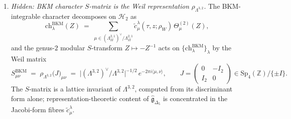\begin{proposition}
\begin{enumerate}[label=\textup{(\roman*)}]
\[
 \tilde c^\lambda_\mu(\tau,z;\rho_W)\;=\;\mathrm{ch}_{L(\lambda)}(\tau,z;\rho_W)/\Delta_5(\tau,z,\rho_W)
\]
are holomorphic Jacobi forms of \emph{genus~$2$}, weight~$-1$, index~$1$ in the sense of Krieg 1995 \emph{Proc.\ AMS}~123 Theorem~3.1, with nonnegative integral Fourier coefficients encoding $\mathfrak g_{\Delta_5}$-root multiplicities per sector $(\lambda,\mu)$ (Gritsenko 1999 \emph{St.\ Petersburg Math.\ J.}~11 \S1 Proposition~1.4). The Weyl-vector shift $q\mapsto q\,e^{\langle\rho_W,\cdot\rangle}$ forces every imaginary simple into strictly negative $\rho_W$-pairing and kills the radical-null divergence.
\item \emph{Hidden: BKM character $S$-matrix is the Weil representation $\rho_{\Lambda^{3,2}}$.} The BKM-integrable character decomposes on $\mathcal H_2$ as
\[
 \mathrm{ch}_\lambda^{\mathrm{BKM}}(Z)\;=\;\sum_{\mu\in(\Lambda^{2,1}_{II})^\vee/\Lambda^{2,1}_{II}}\tilde c^\lambda_\mu(\tau,z;\rho_W)\,\Theta^{(2)}_\mu(Z),
\]
and the genus-$2$ modular $S$-transform $Z\mapsto-Z^{-1}$ acts on $\{\mathrm{ch}_\lambda^{\mathrm{BKM}}\}_\lambda$ by the Weil matrix
\[
 S^{\mathrm{BKM}}_{\mu\nu}\;=\;\rho_{\Lambda^{3,2}}\!\bigl(J\bigr)_{\mu\nu}\;=\;\bigl|(\Lambda^{3,2})^\vee/\Lambda^{3,2}\bigr|^{-1/2}\,e^{-2\pi i\langle\mu,\nu\rangle},\qquad J=\begin{pmatrix}0&-I_2\\I_2&0\end{pmatrix}\in\mathrm{Sp}_4(\mathbb Z)/\{\pm I\}.
\]
The $S$-matrix is a lattice invariant of $\Lambda^{3,2}$, computed from its discriminant form alone; representation-theoretic content of $\hat{\mathfrak g}_{\Delta_5}$ is concentrated in the Jacobi-form fibres $\tilde c^\lambda_\mu$.
\end{enumerate}
\end{proposition}

